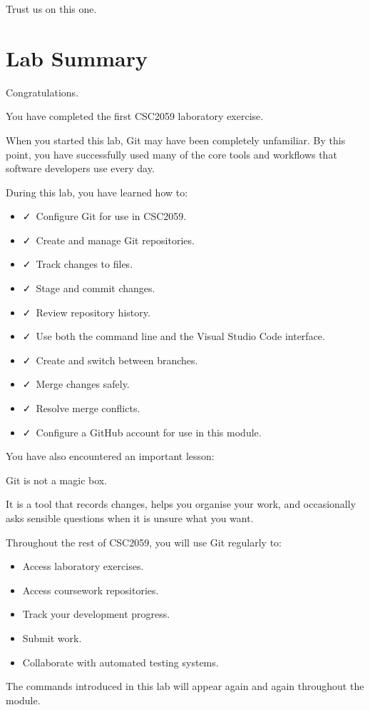\documentclass{csc2059practical}
\begin{document}
Trust us on this one.

\section{Lab Summary}
Congratulations.

You have completed the first CSC2059 laboratory exercise.

When you started this lab, Git may have been completely unfamiliar. By this point, you have successfully used many of the core tools and workflows that software developers use every day.

During this lab, you have learned how to:

\begin{itemize}
  \item \faCheck\ Configure Git for use in CSC2059.
  \item \faCheck\ Create and manage Git repositories.
  \item \faCheck\ Track changes to files.
  \item \faCheck\ Stage and commit changes.
  \item \faCheck\ Review repository history.
  \item \faCheck\ Use both the command line and the Visual Studio Code interface.
  \item \faCheck\ Create and switch between branches.
  \item \faCheck\ Merge changes safely.
  \item \faCheck\ Resolve merge conflicts.
  \item \faCheck\ Configure a GitHub account for use in this module.
\end{itemize}
You have also encountered an important lesson:

Git is not a magic box.

It is a tool that records changes, helps you organise your work, and occasionally asks sensible questions when it is unsure what you want.

Throughout the rest of CSC2059, you will use Git regularly to:

\begin{itemize}
  \item Access laboratory exercises.
  \item Access coursework repositories.
  \item Track your development progress.
  \item Submit work.
  \item Collaborate with automated testing systems.
\end{itemize}
The commands introduced in this lab will appear again and again throughout the module.
\end{document}
